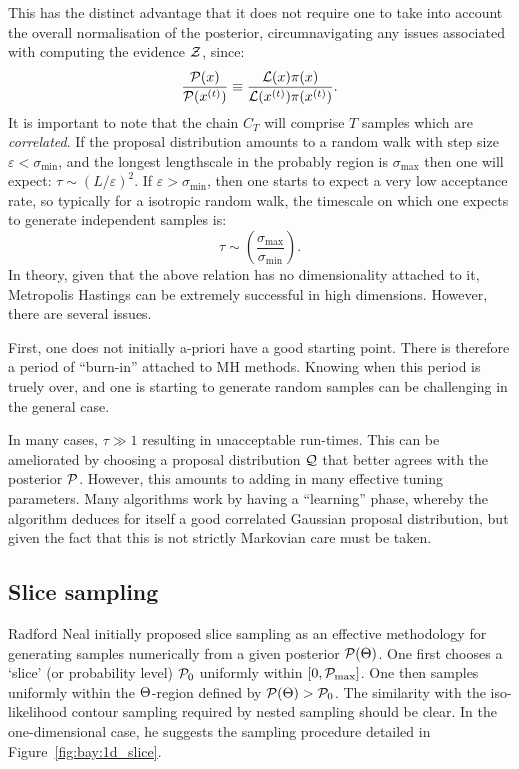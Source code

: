 This has the distinct advantage that it does not require one to take into account the overall normalisation of the posterior, circumnavigating any issues associated with computing the evidence \(\mathcal{Z}\), since:
\begin{equation}
  \frac{\mathcal{P}(x)}{\mathcal{P}(x^{(t)})} \equiv
  \frac{\mathcal{L}(x)\pi(x)}{\mathcal{L}(x^{(t)})\pi(x^{(t)})}.
\end{equation}
It is important to note that the chain \(C_T\) will comprise \(T\) samples which are {\em correlated}. If the proposal distribution amounts to a random walk with step size \(\varepsilon<\sigma_{\min{}}\), and the longest lengthscale in the probably region is \(\sigma_{\max{}}\)  then one will expect: \(\tau \sim {(L/\varepsilon)}^2\). If \(\varepsilon>\sigma_{\min{}}\), then one starts to expect a very low acceptance rate, so typically for a isotropic random walk, the timescale on which one expects to generate independent samples is:
\begin{equation}
  \tau \sim \left( \frac{\sigma_{\max{}}}{\sigma_{\min{}}} \right).
\end{equation}
In theory, given that the above relation has no dimensionality attached to it, Metropolis Hastings can be extremely successful in high dimensions. However, there are several issues.

First, one does not initially a-priori have a good starting point. There is therefore a period of ``burn-in'' attached to MH methods. Knowing when this period is truely over, and one is starting to generate random samples can be challenging in the general case.

In many cases, \(\tau\gg1\) resulting in unacceptable run-times. This can be ameliorated by choosing a proposal distribution \(\mathcal{Q}\) that better agrees with the posterior \(\mathcal{P}\). However, this amounts to adding in many effective tuning parameters. Many algorithms work by having a ``learning'' phase, whereby the algorithm deduces for itself a good correlated Gaussian proposal distribution, but given the fact that this is not strictly Markovian care must be taken.



\subsection{Slice sampling}
\label{sec:sm:slice}
Radford Neal initially proposed slice sampling as an effective methodology for generating samples numerically from a given posterior \(\mathcal{P}(\Theta)\). One first chooses a `slice' (or probability level) \(\mathcal{P}_0\) uniformly within \([0,\mathcal{P}_{\mathrm{max}}]\). One then samples uniformly within the \(\Theta\)-region defined by \(\mathcal{P}(\Theta)>\mathcal{P}_0\). The similarity with the iso-likelihood contour sampling required by nested sampling should be clear. In the one-dimensional case, he suggests the sampling procedure detailed in Figure~\ref{fig:bay:1d_slice}.

